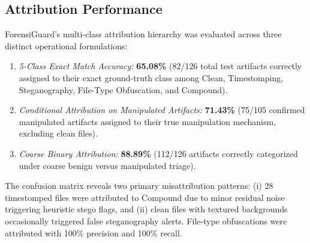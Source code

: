 \documentclass[conference]{IEEEtran}
\begin{document}
\subsection{Attribution Performance}
ForensiGuard's multi-class attribution hierarchy was evaluated across three distinct operational formulations:
\begin{enumerate}
    \item \textit{5-Class Exact Match Accuracy:} \textbf{65.08\%} (82/126 total test artifacts correctly assigned to their exact ground-truth class among Clean, Timestomping, Steganography, File-Type Obfuscation, and Compound).
    \item \textit{Conditional Attribution on Manipulated Artifacts:} \textbf{71.43\%} (75/105 confirmed manipulated artifacts assigned to their true manipulation mechanism, excluding clean files).
    \item \textit{Coarse Binary Attribution:} \textbf{88.89\%} (112/126 artifacts correctly categorized under coarse benign versus manipulated triage).
\end{enumerate}
The confusion matrix reveals two primary misattribution patterns: (i) 28 timestomped files were attributed to Compound due to minor residual noise triggering heuristic stego flags, and (ii) clean files with textured backgrounds occasionally triggered false steganography alerts. File-type obfuscations were attributed with 100\% precision and 100\% recall.
\end{document}
